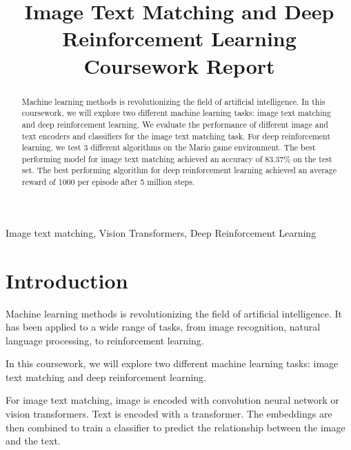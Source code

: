 \documentclass[conference]{IEEEtran}
\begin{document}
\title{Image Text Matching and Deep Reinforcement Learning Coursework Report}

\author{
}

\maketitle

\begin{abstract}
    Machine learning methods is revolutionizing the field of artificial intelligence. In this coursework, we will explore two different machine learning tasks: image text matching and deep reinforcement learning. We evaluate the performance of different image and text encoders and classifiers for the image text matching task. For deep reinforcement learning, we test 3 different algorithms on the Mario game environment. The best performing model for image text matching achieved an accuracy of 83.37\% on the test set. The best performing algorithm for deep reinforcement learning achieved an average reward of 1000 per episode after 5 million steps.
\end{abstract}

\begin{IEEEkeywords}
    Image text matching, Vision Transformers, Deep Reinforcement Learning
\end{IEEEkeywords}


\section{Introduction}

Machine learning methods is revolutionizing the field of artificial intelligence. It has been applied to a wide range of tasks, from image recognition, natural language processing, to reinforcement learning.

In this coursework, we will explore two different machine learning tasks: image text matching and deep reinforcement learning.

For image text matching, image is encoded with convolution neural network or vision transformers. Text is encoded with a transformer. The embeddings are then combined to train a classifier to predict the relationship between the image and the text.
\end{document}
